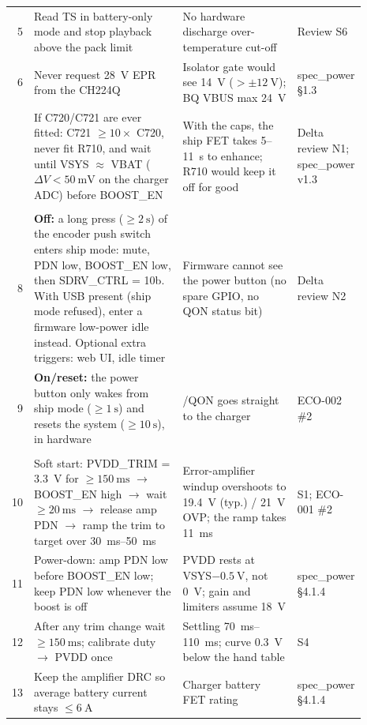{\begin{longtable}{@{}r >{\raggedright\arraybackslash}p{0.43\linewidth} >{\raggedright\arraybackslash}p{0.33\linewidth} >{\raggedright\arraybackslash}p{0.13\linewidth}@{}}
5 & Read TS in battery-only mode and stop playback above the pack limit & No hardware discharge over-temperature cut-off & Review S6 \\
6 & Never request \qty{28}{\volt} EPR from the CH224Q & Isolator gate would see \qty{14}{\volt} ($>\pm\qty{12}{\volt}$); BQ VBUS max \qty{24}{\volt} & spec\_power §1.3 \\
\addlinespace
7 & If C720/C721 are ever fitted: C721 $\ge10\times$ C720, never fit R710, and wait until VSYS $\approx$ VBAT ($\Delta V<\qty{50}{\milli\volt}$ on the charger ADC) before BOOST\_EN & With the caps, the ship FET takes 5--\qty{11}{\second} to enhance; R710 would keep it off for good & Delta review N1; spec\_power v1.3 \\
\addlinespace
\multicolumn{4}{@{}l}{\textbf{Power on and off}} \\
8 & \textbf{Off:} a long press ($\ge\qty{2}{\second}$) of the encoder push switch enters ship mode: mute, PDN low, BOOST\_EN low, then SDRV\_CTRL = 10b. With USB present (ship mode refused), enter a firmware low-power idle instead. Optional extra triggers: web UI, idle timer & Firmware cannot see the power button (no spare GPIO, no QON status bit) & Delta review N2 \\
9 & \textbf{On/reset:} the power button only wakes from ship mode ($\ge\qty{1}{\second}$) and resets the system ($\ge\qty{10}{\second}$), in hardware & /QON goes straight to the charger & ECO-002 \#2 \\
\addlinespace
\multicolumn{4}{@{}l}{\textbf{Boost and amplifier sequencing}} \\
10 & Soft start: PVDD\_TRIM = \qty{3.3}{\volt} for $\ge\qty{150}{\milli\second}$ $\to$ BOOST\_EN high $\to$ wait $\ge\qty{20}{\milli\second}$ $\to$ release amp PDN $\to$ ramp the trim to target over \qtyrange{30}{50}{\milli\second} & Error-amplifier windup overshoots to \qty{19.4}{\volt} (typ.) / \qty{21}{\volt} OVP; the ramp takes \qty{11}{\milli\second} & S1; ECO-001 \#2 \\
11 & Power-down: amp PDN low before BOOST\_EN low; keep PDN low whenever the boost is off & PVDD rests at VSYS$-\qty{0.5}{\volt}$, not \qty{0}{\volt}; gain and limiters assume \qty{18}{\volt} & spec\_power §4.1.4 \\
12 & After any trim change wait $\ge\qty{150}{\milli\second}$; calibrate duty $\to$ PVDD once & Settling \qtyrange{70}{110}{\milli\second}; curve \qty{0.3}{\volt} below the hand table & S4 \\
13 & Keep the amplifier DRC so average battery current stays $\le\qty{6}{\ampere}$ & Charger battery FET rating & spec\_power §4.1.4 \\

\end{longtable}}
